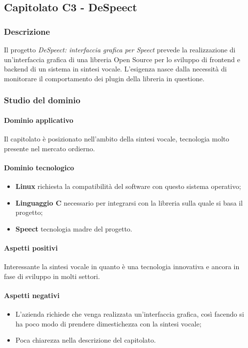	
	\subsection{Capitolato C3 - DeSpeect}
	\subsubsection{Descrizione}	
		Il progetto \emph{DeSpeect: interfaccia grafica per Speect} prevede la realizzazione di un'interfaccia grafica di una libreria Open Source per lo sviluppo di frontend e backend di un sistema in sintesi vocale.
		L'esigenza nasce dalla necessità di monitorare il comportamento dei plugin della libreria in questione.
	\subsubsection{Studio del dominio}
	
	\paragraph{Dominio applicativo} \Spazio
     Il capitolato è posizionato nell'ambito della sintesi vocale, tecnologia molto presente nel mercato ordierno. 
	\paragraph{Dominio tecnologico}
	\begin{itemize}
		\item \textbf{Linux} richiesta la compatibilità del software con questo sistema operativo;
		\item  \textbf{Linguaggio C} necessario per integrarsi con la libreria sulla quale si basa il progetto;
		\item  \textbf{Speect} tecnologia madre del progetto.
	\end{itemize}
	\paragraph{Aspetti positivi} \Spazio
	Interessante la sintesi vocale in quanto è una tecnologia innovativa e ancora in fase di sviluppo in molti settori.
	\paragraph{Aspetti negativi} \Spazio 
	\begin{itemize}
		\item L'azienda richiede che venga realizzata un'interfaccia grafica, così facendo si ha poco modo di prendere dimestichezza con la sintesi vocale;
		\item Poca chiarezza nella descrizione del capitolato.
	\end{itemize}
